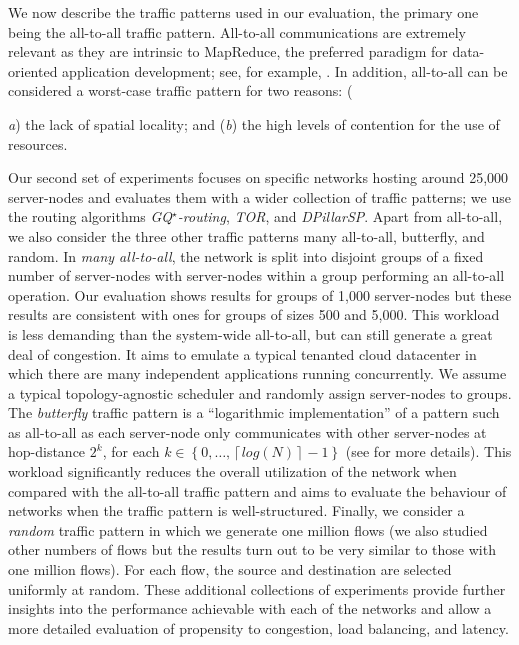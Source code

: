 \documentclass[]{amsart}
\begin{document}
We now describe the traffic patterns used in our evaluation, the
primary one being the all-to-all traffic pattern. All-to-all communications are extremely relevant as they are intrinsic to MapReduce, the preferred paradigm for data-oriented application
development; see, for example,
\cite{LiuMuppalaVeeraraghavan2013,DeanGhemawat2008,White2009}.  In
addition, all-to-all can be considered a worst-case traffic pattern
for two reasons: ({\emph{a\/}) the lack of spatial locality; and
(\emph{b\/}) the high levels of contention for the use of resources.

Our second set of experiments focuses on specific networks hosting
around 25,000 server-nodes and evaluates them with a wider collection of traffic patterns; we use the routing algorithms \emph{GQ$^\star$-routing\/}, \emph{TOR\/}, and \emph{DPillarSP\/}.  Apart from all-to-all, we also consider the three other traffic patterns many all-to-all, butterfly, and random.  In \emph{many all-to-all\/}, the network is split into disjoint
groups of a fixed number of server-nodes with server-nodes within a group
performing an all-to-all operation.  Our evaluation shows results for
groups of 1,000 server-nodes but these results are consistent with ones for groups
of sizes 500 and 5,000.  This workload is less demanding than the
system-wide all-to-all, but can still generate a great deal of
congestion.  It aims to emulate a typical tenanted cloud datacenter
in which there are many independent applications running concurrently.  We assume
a typical topology-agnostic scheduler and randomly assign server-nodes to
groups.  The \emph{butterfly} traffic pattern is a ``logarithmic
implementation'' of a pattern such as all-to-all as each server-node only communicates with other server-nodes
at hop-distance $2^k$, for each $k\in \left\{0, \ldots,
  \left\lceil{log(N)}\right\rceil - 1 \right\}$ (see
\cite{NavaridasMiguel-AlonsoRidruejo2008} for more details).  This
workload significantly reduces the overall utilization of the network
when compared with the all-to-all traffic pattern and aims to
evaluate the behaviour of networks when the traffic pattern is
well-structured.  Finally, we consider a \emph{random} traffic pattern
in which we generate one million flows (we also studied other numbers
of flows but the results turn out to be very similar to those with one million
flows).  For each flow, the source and destination are
selected uniformly at random.  These additional
collections of experiments provide further insights into the
performance achievable with each of the networks and allow a more
detailed evaluation of propensity to congestion, load balancing, and latency.


}
\end{document}

